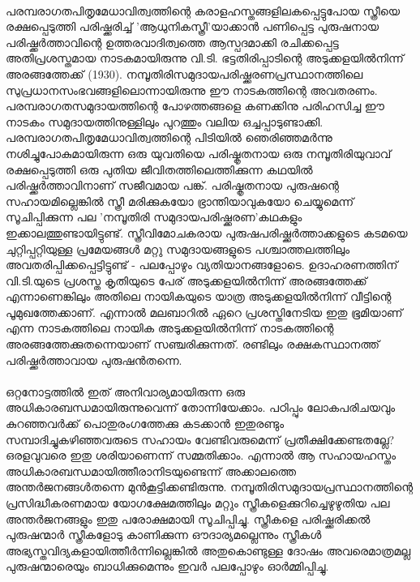 \paragraph{}പരമ്പരാഗതപിതൃമേധാവിത്വത്തിന്റെ കരാളഹസ്തങ്ങളിലകപ്പെട്ടുപോയ സ്ത്രീയെ രക്ഷപ്പെടുത്തി പരിഷ്ക്കരിച്ച് 'ആധുനികസ്ത്രീ'യാക്കാൻ പണിപ്പെട്ട പുരുഷനായ പരിഷ്ക്കർത്താവിന്റെ ഉത്തരവാദിത്വത്തെ ആസ്പദമാക്കി രചിക്കപ്പെട്ട അതിപ്രശസ്തമായ നാടകമായിരുന്നു വി.ടി. ഭട്ടതിരിപ്പാടിന്റെ അടുക്കളയിൽനിന്ന് അരങ്ങത്തേക്ക് (1930). നമ്പൂതിരിസമുദായപരിഷ്ക്കരണപ്രസ്ഥാനത്തിലെ സുപ്രധാനസംഭവങ്ങളിലൊന്നായിരുന്നു ഈ നാടകത്തിന്റെ അവതരണം. പരമ്പരാഗതസമുദായത്തിന്റെ പോഴത്തങ്ങളെ കണക്കിനു പരിഹസിച്ച ഈ നാടകം സമുദായത്തിനുള്ളിലും പുറത്തും വലിയ ഒച്ചപ്പാടുണ്ടാക്കി. പരമ്പരാഗതപിതൃമേധാവിത്വത്തിന്റെ പിടിയിൽ ഞെരിഞ്ഞമർന്നു നശിച്ചുപോകുമായിരുന്ന ഒരു യുവതിയെ പരിഷ്കൃതനായ ഒരു നമ്പൂതിരിയുവാവ് രക്ഷപ്പെടുത്തി ഒരു പുതിയ ജീവിതത്തിലെത്തിക്കുന്ന കഥയിൽ പരിഷ്ക്കർത്താവിനാണ് സജീവമായ പങ്ക്. പരിഷ്കൃതനായ പുരുഷന്റെ സഹായമില്ലെങ്കിൽ സ്ത്രീ മരിക്കുകയോ ഭ്രാന്തിയാവുകയോ ചെയ്യുമെന്ന് സൂചിപ്പിക്കുന്ന പല 'നമ്പൂതിരി സമുദായപരിഷ്ക്കരണ'കഥകളും ഇക്കാലത്തുണ്ടായിട്ടുണ്ട്. സ്ത്രീവിമോചകരായ പുരുഷപരിഷ്ക്കർത്താക്കളുടെ കടമയെ ചുറ്റിപ്പറ്റിയുള്ള പ്രമേയങ്ങൾ മറ്റു സമുദായങ്ങളുടെ പശ്ചാത്തലത്തിലും അവതരിപ്പിക്കപ്പെട്ടിട്ടുണ്ട് - പലപ്പോഴും വ്യതിയാനങ്ങളോടെ. ഉദാഹരണത്തിന് വി.ടി.യുടെ പ്രശസ്ത കൃതിയുടെ പേര് അടുക്കളയിൽനിന്ന് അരങ്ങത്തേക്ക് എന്നാണെങ്കിലും അതിലെ നായികയുടെ യാത്ര അടുക്കളയിൽനിന്ന് വീട്ടിന്റെ പൂമുഖത്തേക്കാണ്. എന്നാൽ മലബാറിൽ ഏറെ പ്രശസ്തിനേടിയ ഇതു ഭൂമിയാണ് എന്ന നാടകത്തിലെ നായിക അടുക്കളയിൽനിന്ന് നാടകത്തിന്റെ അരങ്ങത്തേക്കുതന്നെയാണ് സഞ്ചരിക്കുന്നത്. രണ്ടിലും രക്ഷകസ്ഥാനത്ത് പരിഷ്ക്കർത്താവായ പുരുഷൻതന്നെ.

\paragraph{}ഒറ്റനോട്ടത്തിൽ ഇത് അനിവാര്യമായിരുന്ന ഒരു അധികാരബന്ധമായിരുന്നുവെന്ന് തോന്നിയേക്കാം. പഠിപ്പും ലോകപരിചയവും കുറഞ്ഞവർക്ക് പൊതുരംഗത്തേക്കു കടക്കാൻ ഇതുരണ്ടും സമ്പാദിച്ചുകഴിഞ്ഞവരുടെ സഹായം വേണ്ടിവരുമെന്ന് പ്രതീക്ഷിക്കേണ്ടതല്ലേ? ഒരളവുവരെ ഇതു ശരിയാണെന്ന് സമ്മതിക്കാം. എന്നാൽ ആ സഹായഹസ്തം അധികാരബന്ധമായിത്തീരാനിടയുണ്ടെന്ന് അക്കാലത്തെ അന്തർജനങ്ങൾതന്നെ മുൻകൂട്ടിക്കണ്ടിരുന്നു. നമ്പൂതിരിസമുദായപ്രസ്ഥാനത്തിന്റെ പ്രസിദ്ധീകരണമായ യോഗക്ഷേമത്തിലും മറ്റും സ്ത്രീകളെക്കുറിച്ചെഴുഴുതിയ പല അന്തർജനങ്ങളും ഇതു പരോക്ഷമായി സൂചിപ്പിച്ചു. സ്ത്രീകളെ പരിഷ്ക്കരിക്കൽ പുരുഷന്മാർ സ്ത്രീകളോടു കാണിക്കുന്ന ഔദാര്യമല്ലെന്നും സ്ത്രീകൾ അഭ്യസ്തവിദ്യകളായിത്തീർന്നില്ലെങ്കിൽ അതുകൊണ്ടുള്ള ദോഷം അവരെമാത്രമല്ല പുരുഷന്മാരെയും ബാധിക്കുമെന്നും ഇവർ പലപ്പോഴും ഓർമ്മിപ്പിച്ചു.

